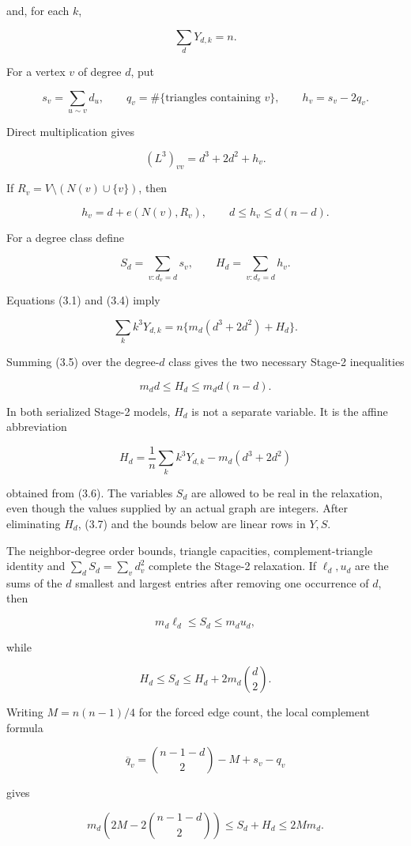 \documentclass[
  english,
  11pt,
  a4paper,
]{article}
\begin{document}
and, for each \(k\),

\[
\sum_dY_{d,k}=n.
\tag{3.3}
\]

For a vertex \(v\) of degree \(d\), put

\[
s_v=\sum_{u\sim v}d_u,
\qquad
q_v=\#\{\text{triangles containing }v\},
\qquad
h_v=s_v-2q_v.
\]

Direct multiplication gives

\[
(L^3)_{vv}=d^3+2d^2+h_v.
\tag{3.4}
\]

If \(R_v=V\setminus(N(v)\cup\{v\})\), then

\[
h_v=d+e(N(v),R_v),
\qquad d\le h_v\le d(n-d).
\tag{3.5}
\]

For a degree class define

\[
S_d=\sum_{v:d_v=d}s_v,
\qquad
H_d=\sum_{v:d_v=d}h_v.
\]

Equations (3.1) and (3.4) imply

\[
\sum_kk^3Y_{d,k}=n\{m_d(d^3+2d^2)+H_d\}.
\tag{3.6}
\]

Summing (3.5) over the degree-\(d\) class gives the two necessary
Stage-2 inequalities

\[
m_dd\le H_d\le m_dd(n-d).
\tag{3.7}
\]

In both serialized Stage-2 models, \(H_d\) is not a separate variable.
It is the affine abbreviation

\[
H_d=\frac1n\sum_k k^3Y_{d,k}-m_d(d^3+2d^2)
\]

obtained from (3.6). The variables \(S_d\) are allowed to be real in the
relaxation, even though the values supplied by an actual graph are
integers. After eliminating \(H_d\), (3.7) and the bounds below are
linear rows in \(Y,S\).

The neighbor-degree order bounds, triangle capacities,
complement-triangle identity and \(\sum_dS_d=\sum_vd_v^2\) complete the
Stage-2 relaxation. If \(\ell_d,u_d\) are the sums of the \(d\) smallest
and largest entries after removing one occurrence of \(d\), then

\[
m_d\ell_d\le S_d\le m_du_d,
\tag{3.8}
\]

while

\[
H_d\le S_d\le H_d+2m_d\binom d2.
\tag{3.9}
\]

Writing \(M=n(n-1)/4\) for the forced edge count, the local complement
formula

\[
\overline q_v=\binom{n-1-d}{2}-M+s_v-q_v
\tag{3.10}
\]

gives

\[
m_d\left(2M-2\binom{n-1-d}{2}\right)
\le S_d+H_d\le2Mm_d.
\tag{3.11}
\]
\end{document}
